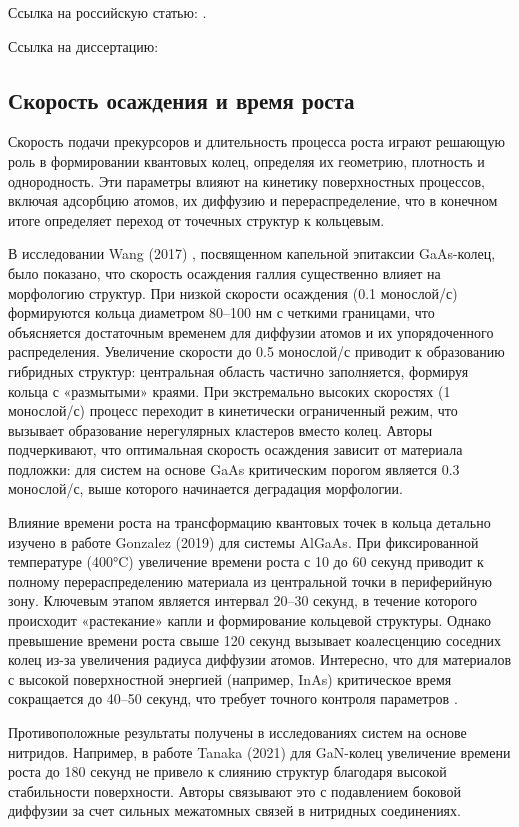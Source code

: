 \documentclass[14pt,oneside]{extarticle}
\begin{document}
Ссылка на российскую статью: \cite{skubachevskii1}.

Ссылка на диссертацию:  \cite{pavlichenko1}

\subsection{Скорость осаждения и время роста}

Скорость подачи прекурсоров и длительность процесса роста играют решающую роль в формировании квантовых колец, определяя их геометрию, плотность и однородность. Эти параметры влияют на кинетику поверхностных процессов, включая адсорбцию атомов, их диффузию и перераспределение, что в конечном итоге определяет переход от точечных структур к кольцевым.

В исследовании Wang (2017) \cite{Wang1}, посвященном капельной эпитаксии GaAs-колец, было показано, что скорость осаждения галлия существенно влияет на морфологию структур. При низкой скорости осаждения (0.1 монослой/с) формируются кольца диаметром 80–100 нм с четкими границами, что объясняется достаточным временем для диффузии атомов и их упорядоченного распределения. Увеличение скорости до 0.5 монослой/с приводит к образованию гибридных структур: центральная область частично заполняется, формируя кольца с «размытыми» краями. При экстремально высоких скоростях (1 монослой/с) процесс переходит в кинетически ограниченный режим, что вызывает образование нерегулярных кластеров вместо колец. Авторы подчеркивают, что оптимальная скорость осаждения зависит от материала подложки: для систем на основе GaAs критическим порогом является 0.3 монослой/с, выше которого начинается деградация морфологии.

Влияние времени роста на трансформацию квантовых точек в кольца детально изучено в работе Gonzalez (2019) \cite{Gonzalez1} для системы AlGaAs. При фиксированной температуре (400°C) увеличение времени роста с 10 до 60 секунд приводит к полному перераспределению материала из центральной точки в периферийную зону. Ключевым этапом является интервал 20–30 секунд, в течение которого происходит «растекание» капли и формирование кольцевой структуры. Однако превышение времени роста свыше 120 секунд вызывает коалесценцию соседних колец из-за увеличения радиуса диффузии атомов. Интересно, что для материалов с высокой поверхностной энергией (например, InAs) критическое время сокращается до 40–50 секунд, что требует точного контроля параметров \cite{Ivanov1}.

Противоположные результаты получены в исследованиях систем на основе нитридов. Например, в работе Tanaka (2021) \cite{Tanaka1} для GaN-колец увеличение времени роста до 180 секунд не привело к слиянию структур благодаря высокой стабильности поверхности. Авторы связывают это с подавлением боковой диффузии за счет сильных межатомных связей в нитридных соединениях.
\end{document}
